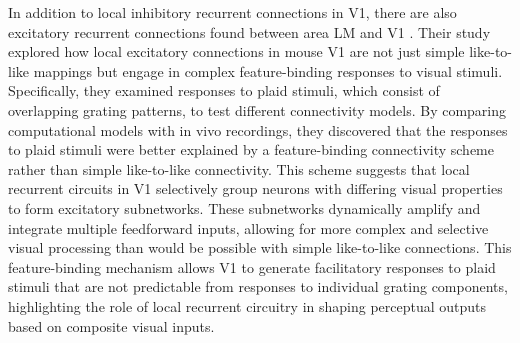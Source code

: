 \documentclass[12pt]{article}
\begin{document}
In addition to local inhibitory recurrent connections in V1, there are also excitatory recurrent connections found between area LM and V1 \autocite{muirSpecificExcitatoryConnectivity2017}. Their study explored how local excitatory connections in mouse V1 are not just simple like-to-like mappings but engage in complex feature-binding responses to visual stimuli. Specifically, they examined responses to plaid stimuli, which consist of overlapping grating patterns, to test different connectivity models. By comparing computational models with in vivo recordings, they discovered that the responses to plaid stimuli were better explained by a feature-binding connectivity scheme rather than simple like-to-like connectivity. This scheme suggests that local recurrent circuits in V1 selectively group neurons with differing visual properties to form excitatory subnetworks. These subnetworks dynamically amplify and integrate multiple feedforward inputs, allowing for more complex and selective visual processing than would be possible with simple like-to-like connections. This feature-binding mechanism allows V1 to generate facilitatory responses to plaid stimuli that are not predictable from responses to individual grating components, highlighting the role of local recurrent circuitry in shaping perceptual outputs based on composite visual inputs. 
\end{document}
